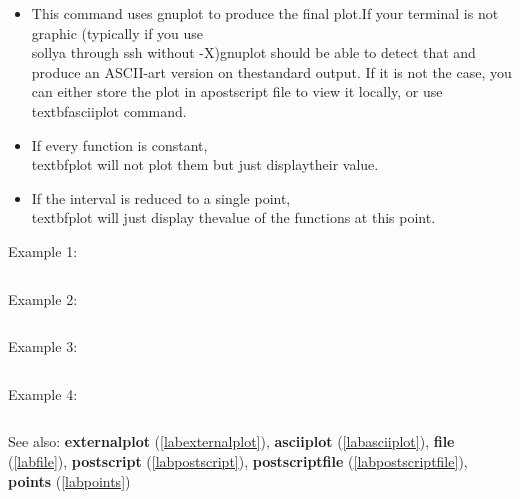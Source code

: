 \begin{itemize}
\item This command uses gnuplot to produce the final plot.\n   If your terminal is not graphic (typically if you use \\sollya through \n   ssh without -X)\n   gnuplot should be able to detect that and produce an ASCII-art version on the\n   standard output. If it is not the case, you can either store the plot in a\n   postscript file to view it locally, or use \\textbf{asciiplot} command.\n
\item If every function is constant, \\textbf{plot} will not plot them but just display\n   their value.\n
\item If the interval is reduced to a single point, \\textbf{plot} will just display the\n   value of the functions at this point.\n\end{itemize}
\noindent Example 1: 
\begin{center}\begin{minipage}{15cm}\begin{Verbatim}[frame=single]
\end{Verbatim}
\end{minipage}\end{center}
\noindent Example 2: 
\begin{center}\begin{minipage}{15cm}\begin{Verbatim}[frame=single]
\end{Verbatim}
\end{minipage}\end{center}
\noindent Example 3: 
\begin{center}\begin{minipage}{15cm}\begin{Verbatim}[frame=single]
\end{Verbatim}
\end{minipage}\end{center}
\noindent Example 4: 
\begin{center}\begin{minipage}{15cm}\begin{Verbatim}[frame=single]
\end{Verbatim}
\end{minipage}\end{center}
See also: \textbf{externalplot} (\ref{labexternalplot}), \textbf{asciiplot} (\ref{labasciiplot}), \textbf{file} (\ref{labfile}), \textbf{postscript} (\ref{labpostscript}), \textbf{postscriptfile} (\ref{labpostscriptfile}), \textbf{points} (\ref{labpoints})
